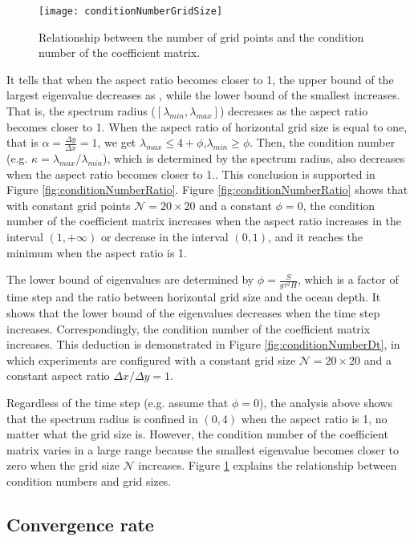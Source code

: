 \begin {figure}[!htbp]
\centering
\texttt{[image: conditionNumberGridSize]}
\caption[] {Relationship between the number of grid points and the condition number of the coefficient matrix.\label{fig:conditionNumbGrid}}
\end{figure}
It tells that when the aspect ratio becomes closer to 1, the upper bound of the largest eigenvalue decreases as , while the lower bound of the smallest increases.
That is,  the spectrum radius ($[\lambda_{min}, \lambda_{max}]$) decreases as the aspect ratio becomes closer to 1.
When the aspect ratio of horizontal grid size is equal to one, that is $ \alpha = \frac{ \Delta y}{ \Delta x} = 1$, we get
$\lambda_{max} \le  4 +\phi$,$\lambda_{min} \ge   \phi$.
Then, the condition number (e.g. $\kappa=  \lambda_{max}/\lambda_{min}$), which is determined by the spectrum radius, also decreases when the aspect ratio becomes closer to 1..
This conclusion is supported in Figure \ref{fig:conditionNumberRatio}. Figure \ref{fig:conditionNumberRatio} shows that with constant grid points $\mathcal{N} = 20\times 20$ and a constant $\phi = 0$,  the condition number of the coefficient matrix increases when the aspect ratio increases in the interval $(1, +\infty)$ or decrease in the interval $(0,1)$, and it reaches the minimum when the aspect ratio is 1.

The lower bound of eigenvalues are determined by  $\phi=\frac{S }{g \tau^2 H}$, which is a factor of time step and the ratio between horizontal grid size and the ocean depth. It shows that the lower bound of the eigenvalues decreases when the time step increases. Correspondingly, the condition number of the coefficient matrix increases. This deduction is demonstrated in Figure \ref{fig:conditionNumberDt}, in which experiments are configured with  a constant grid size  $\mathcal{N} = 20\times 20$  and a constant aspect ratio $\Delta x /{\Delta y} = 1$.


Regardless of the time step (e.g. assume that $\phi=0$), the analysis above shows that the spectrum radius is confined in $(0,4)$ when the aspect ratio is 1, no matter what the grid size is.
However, the condition number of the coefficient matrix varies in a large range because the smallest eigenvalue becomes closer to zero when the grid size $\mathcal{N}$ increases. Figure \ref{fig:conditionNumbGrid} explains the relationship between condition numbers and grid sizes.


\subsection{Convergence rate} \label{convergence_rate}

